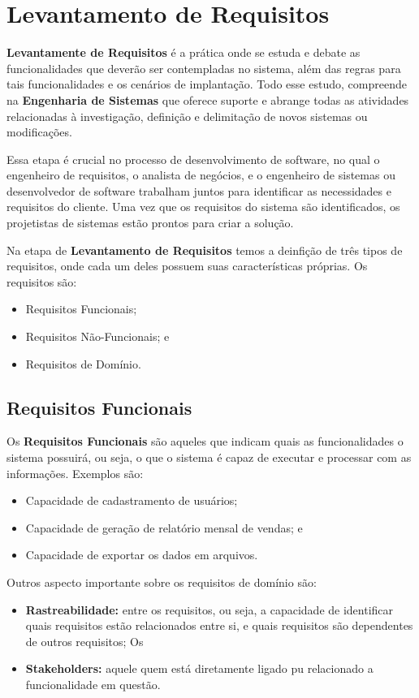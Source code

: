 \documentclass[a4paper,12pt]{article}
\begin{document}
\section{Levantamento de Requisitos}
\textbf{Levantamente de Requisitos} é a prática onde se estuda e debate as funcionalidades que deverão ser contempladas no sistema, além das regras para tais funcionalidades e os cenários de implantação. Todo esse estudo, compreende na \textbf{Engenharia de Sistemas} que oferece suporte e abrange todas as atividades relacionadas à investigação, definição e delimitação de novos sistemas ou modificações.

Essa etapa é crucial no processo de desenvolvimento de software, no qual o engenheiro de requisitos, o analista de negócios, e o engenheiro de sistemas ou desenvolvedor de software trabalham juntos para identificar as necessidades e requisitos do cliente. Uma vez que os requisitos do sistema são identificados, os projetistas de sistemas estão prontos para criar a solução.

Na etapa de \textbf{Levantamento de Requisitos} temos a deinfição de três tipos de requisitos, onde cada um deles possuem suas características próprias. Os requisitos são:
\begin{itemize}
	\item Requisitos Funcionais;
	\item Requisitos Não-Funcionais; e
	\item Requisitos de Domínio.
\end{itemize}



\subsection{Requisitos Funcionais}
Os \textbf{Requisitos Funcionais} são aqueles que indicam quais as funcionalidades o sistema possuirá, ou seja, o que o sistema é capaz de executar e processar com as informações. Exemplos são:
\begin{itemize}
	\item Capacidade de cadastramento de usuários;
	\item Capacidade de geração de relatório mensal de vendas; e
	\item Capacidade de exportar os dados em arquivos.
\end{itemize}
Outros aspecto importante sobre os requisitos de domínio são: 
\begin{itemize}
	\item\textbf{Rastreabilidade:} entre os requisitos, ou seja, a capacidade de identificar quais requisitos estão relacionados entre si, e quais requisitos são dependentes de outros requisitos; Os 
	\item\textbf{Stakeholders:} aquele quem está diretamente ligado pu relacionado a funcionalidade em questão.
\end{itemize}
\end{document}
